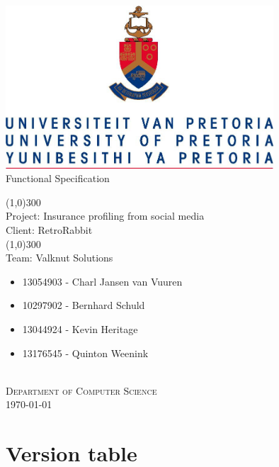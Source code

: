 \documentclass{article}
\begin{document}
	\begin{titlepage}
		\begin{center}
			\includegraphics[width=10cm]{images/UP.jpg}  \\
			[0.5cm]
			\huge{
			Functional Specification\\
			}

			\line(1,0){300}\\
			[0.2cm]
			\LARGE{Project: Insurance profiling from social media\\
			Client: RetroRabbit} \\
			\line(1,0){300}\\
			\LARGE{Team: Valknut Solutions}\\
			[1.0cm]
			\large
			{
			\begin{itemize}
				\item 13054903 - Charl Jansen van Vuuren
				\item 10297902 - Bernhard Schuld
				\item 13044924 - Kevin Heritage
				\item 13176545 - Quinton Weenink\\
			\end{itemize}
			}
			\textsc{\large}\\
		[3.0cm]
		\textsc{\large  Department of Computer Science}\\
		[0.5cm]
		\textsc{\large \today}\\
		\end{center}


	\end{titlepage}
	\cleardoublepage
	\tableofcontents
	\cleardoublepage
\section{Version table}	
\end{document}
